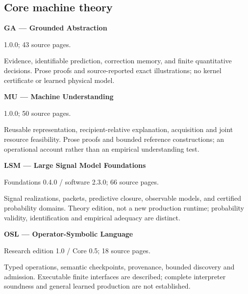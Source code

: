 \subsection*{Core machine theory}

\hypertarget{cat:GA}{}\textbf{GA --- Grounded Abstraction}\par

1.0.0; 43 source pages.\par

Evidence, identifiable prediction, correction memory, and finite quantitative decisions. Prose proofs and source-reported exact illustrations; no kernel certificate or learned physical model.\par

\hypertarget{cat:MU}{}\textbf{MU --- Machine Understanding}\par

1.0.0; 50 source pages.\par

Reusable representation, recipient-relative explanation, acquisition and joint resource feasibility. Prose proofs and bounded reference constructions; an operational account rather than an empirical understanding test.\par

\hypertarget{cat:LSM}{}\textbf{LSM --- Large Signal Model Foundations}\par

Foundations 0.4.0 / software 2.3.0; 66 source pages.\par

Signal realizations, packets, predictive closure, observable models, and certified probability domains. Theory edition, not a new production runtime; probability validity, identification and empirical adequacy are distinct.\par

\hypertarget{cat:OSL}{}\textbf{OSL --- Operator-Symbolic Language}\par

Research edition 1.0 / Core 0.5; 18 source pages.\par

Typed operations, semantic checkpoints, provenance, bounded discovery and admission. Executable finite interfaces are described; complete interpreter soundness and general learned production are not established.\par

